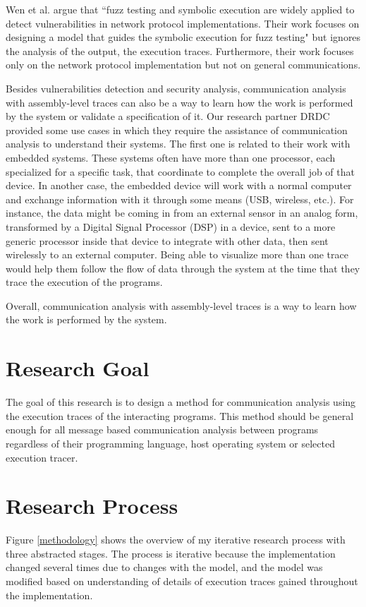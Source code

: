Wen et al. argue that ``fuzz testing and symbolic execution are widely applied to detect vulnerabilities in network protocol implementations. Their work focuses on designing a model that guides the symbolic execution for fuzz testing" \cite{wen2017model} but ignores the analysis of the output, the execution traces. Furthermore, their work focuses only on the network protocol implementation but not on general communications.

Besides vulnerabilities detection and security analysis, communication analysis with assembly-level traces can also be a way to learn how the work is performed by the system or validate a specification of it. Our research partner DRDC provided some use cases in which they require the assistance of communication analysis to understand their systems. The first one is related to their work with embedded systems. These systems often have more than one processor, each specialized for a specific task, that coordinate to complete the overall job of that device.  In another case, the embedded device will work with a normal computer and exchange information with it through some means
(USB, wireless, etc.).  For instance, the data might be coming in from an external sensor in an analog form, transformed by a Digital Signal Processor (DSP) in a device, sent to a more generic processor inside that device to integrate with other data, then sent wirelessly to an external computer. Being able to visualize more than one trace would help them follow the flow of data through the system at the time that they trace the execution of the programs.

Overall, communication analysis with assembly-level traces is a way to learn how the work is performed by the system. 

\section{Research Goal}
The goal of this research is to design a method for communication analysis using the execution traces of the interacting programs. This method should be general enough for all message based communication analysis between programs regardless of their programming language, host operating system or selected execution tracer. 

\section{Research Process}
Figure \ref{methodology} shows the overview of my iterative research process with three abstracted stages. The process is iterative because the implementation changed several times due to changes with the model, and the model was modified based on understanding of details of execution traces gained throughout the implementation. 

